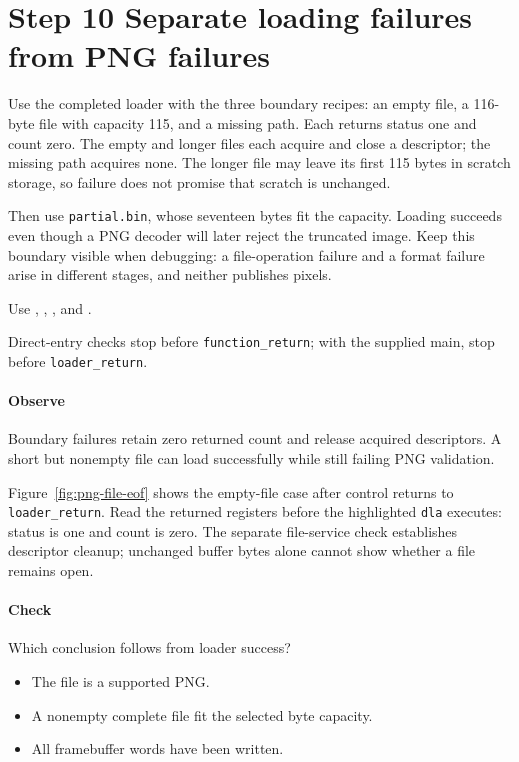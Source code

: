 \section{Step 10 Separate loading failures from PNG failures}\label{png-load-s10}
Use the completed loader with the three boundary recipes: an empty file, a 116-byte file with capacity 115, and a missing path. Each returns status one and count zero. The empty and longer files each acquire and close a descriptor; the missing path acquires none. The longer file may leave its first 115 bytes in scratch storage, so failure does not promise that scratch is unchanged.

Then use \texttt{partial.bin}, whose seventeen bytes fit the capacity. Loading succeeds even though a PNG decoder will later reject the truncated image. Keep this boundary visible when debugging: a file-operation failure and a format failure arise in different stages, and neither publishes pixels.

Use , , , and .

Direct-entry checks stop before \texttt{function\_return}; with the supplied main, stop before \texttt{loader\_return}.

\paragraph{Observe} Boundary failures retain zero returned count and release acquired descriptors. A short but nonempty file can load successfully while still failing PNG validation.

Figure~\ref{fig:png-file-eof} shows the empty-file case after control returns to
\texttt{loader\_return}. Read the returned registers before the highlighted
\texttt{dla} executes: status is one and count is zero. The separate file-service
check establishes descriptor cleanup; unchanged buffer bytes alone cannot show
whether a file remains open.


\clearpage

\paragraph{Check} Which conclusion follows from loader success?
\begin{itemize}
  \item[A.] The file is a supported PNG.
  \item[B.] A nonempty complete file fit the selected byte capacity.
  \item[C.] All framebuffer words have been written.
\end{itemize}
